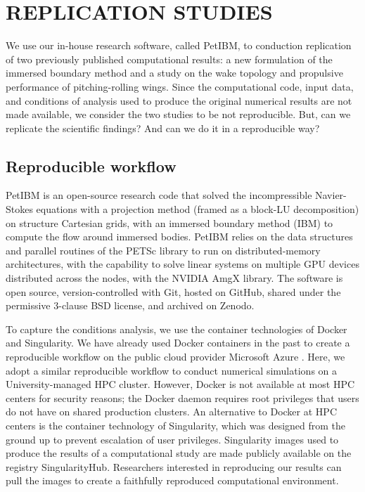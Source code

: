\documentclass{parcfd}
\begin{document}
\section{REPLICATION STUDIES}

We use our in-house research software, called PetIBM, to conduction replication of two previously published computational results: a new formulation of the immersed boundary method and a study on the wake topology and propulsive performance of pitching-rolling wings.
Since the computational code, input data, and conditions of analysis used to produce the original numerical results are not made available, we consider the two studies to be not reproducible.
But, can we replicate the scientific findings? And can we do it in a reproducible way?

\subsection{Reproducible workflow}

PetIBM \cite{chuang_et_al_2018} is an open-source research code that solved the incompressible Navier-Stokes equations with a projection method (framed as a block-LU decomposition) on structure Cartesian grids, with an immersed boundary method (IBM) to compute the flow around immersed bodies.
PetIBM relies on the data structures and parallel routines of the PETSc library to run on distributed-memory architectures, with the capability to solve linear systems on multiple GPU devices distributed across the nodes, with the NVIDIA AmgX library.
The software is open source, version-controlled with Git, hosted on GitHub, shared under the permissive 3-clause BSD license, and archived on Zenodo.

To capture the conditions analysis, we use the container technologies of Docker and Singularity.
We have already used Docker containers in the past to create a reproducible workflow on the public cloud provider Microsoft Azure \cite{mesnard_barba_2020}.
Here, we adopt a similar reproducible workflow to conduct numerical simulations on a University-managed HPC cluster.
However, Docker is not available at most HPC centers for security reasons; the Docker daemon requires root privileges that users do not have on shared production clusters.
An alternative to Docker at HPC centers is the container technology of Singularity, which was designed from the ground up to prevent escalation of user privileges.
Singularity images used to produce the results of a computational study are made publicly available on the registry SingularityHub.
Researchers interested in reproducing our results can pull the images to create a faithfully reproduced computational environment.
\end{document}
